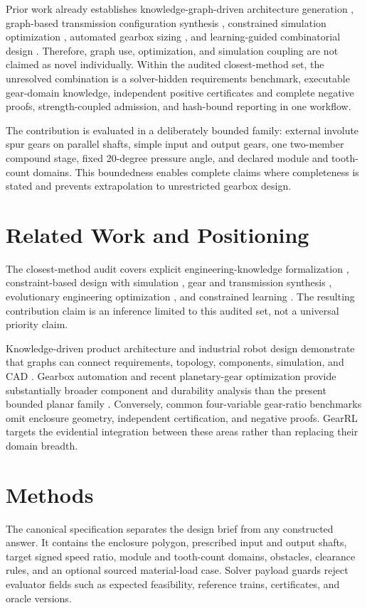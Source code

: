 \documentclass[preprint,12pt]{elsarticle}
\begin{document}
Prior work already establishes knowledge-graph-driven architecture generation \cite{huang-2025,sun-2026}, graph-based transmission configuration synthesis \cite{geng-2023}, constrained simulation optimization \cite{cicconi-2020}, automated gearbox sizing \cite{fuerst-2021}, and learning-guided combinatorial design \cite{lin-2023}. Therefore, graph use, optimization, and simulation coupling are not claimed as novel individually. Within the audited closest-method set, the unresolved combination is a solver-hidden requirements benchmark, executable gear-domain knowledge, independent positive certificates and complete negative proofs, strength-coupled admission, and hash-bound reporting in one workflow.

The contribution is evaluated in a deliberately bounded family: external involute spur gears on parallel shafts, simple input and output gears, one two-member compound stage, fixed 20-degree pressure angle, and declared module and tooth-count domains. This boundedness enables complete claims where completeness is stated and prevents extrapolation to unrestricted gearbox design.

\section{Related Work and Positioning}
The closest-method audit covers explicit engineering-knowledge formalization \cite{hao-2021,bolognini-2022}, constraint-based design with simulation \cite{cicconi-2020}, gear and transmission synthesis \cite{fuerst-2021,geng-2023,kim-2026}, evolutionary engineering optimization \cite{fetanat-2023}, and constrained learning \cite{lin-2023}. The resulting contribution claim is an inference limited to this audited set, not a universal priority claim.

Knowledge-driven product architecture and industrial robot design demonstrate that graphs can connect requirements, topology, components, simulation, and CAD \cite{huang-2025,sun-2026}. Gearbox automation and recent planetary-gear optimization provide substantially broader component and durability analysis than the present bounded planar family \cite{fuerst-2021,kim-2026}. Conversely, common four-variable gear-ratio benchmarks omit enclosure geometry, independent certification, and negative proofs. GearRL targets the evidential integration between these areas rather than replacing their domain breadth.

\section{Methods}
The canonical specification separates the design brief from any constructed answer. It contains the enclosure polygon, prescribed input and output shafts, target signed speed ratio, module and tooth-count domains, obstacles, clearance rules, and an optional sourced material-load case. Solver payload guards reject evaluator fields such as expected feasibility, reference trains, certificates, and oracle versions.
\end{document}
